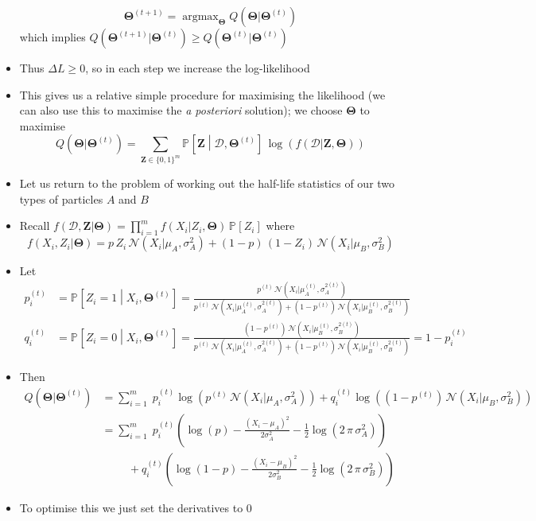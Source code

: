 \documentclass[11pt]{article}
\newcommand{\Prob}[2][]{\mathbb{P}_{#1\!}\left[ #2 \right]}
\newcommand{\logg}[1]{\log\!\left( #1 \right)}
\newcommand{\normal}[2]{\mathcal{N}\!\left(#1 \big| #2 \right)}
\newcommand{\argmax}{\mathop{\mathrm{argmax}}}
\begin{document}
\begin{itemize}
$$ \bm{\Theta}^{(t+1)} = \argmax_{\bm{\Theta}}
      Q(\bm{\Theta}|\bm{\Theta}^{(t)}) $$
which implies \(Q(\bm{\Theta}^{(t+1)}|\bm{\Theta}^{(t)}) \geq
      Q(\bm{\Theta}^{(t)}|\bm{\Theta}^{(t)})\)
\item Thus \(\Delta L\geq 0\), so in each step we increase the log-likelihood
\item This gives us a relative simple procedure for maximising the likelihood
(we can also use this to maximise the \emph{a posteriori} solution);
we choose \(\bm{\Theta}\) to maximise
$$ Q(\bm{\Theta}|\bm{\Theta}^{(t)}) = \sum_{\bm{Z}\in\{0,1\}^m} \Prob{\bm{Z}\middle|\mathcal{D},\bm{\Theta}^{(t)}}\,
      \logg{f(\mathcal{D}|\bm{Z}, \bm{\Theta})} $$
\item Let us return to the problem of working out the half-life statistics of
our two types of particles \(A\) and \(B\)
\item Recall \(f(\mathcal{D},\bm{Z} |\bm{\Theta}) =
      \prod\limits_{i=1}^m  f(X_i|Z_i,\bm{\Theta}) \, \Prob{Z_i}\) where
$$ f(X_i,Z_i|\bm{\Theta}) = p\, Z_i\,\normal{X_i}{\mu_A,\sigma_A^2} +
        (1-p)\,(1-Z_i)\,\normal{X_i}{\mu_B,\sigma_B^2} $$
\item Let 
 \begin{align*}
 p_i^{(t)} &= \Prob{Z_i=1\middle|X_i, \bm{\Theta}^{(t)}} = 
 \frac{p^{(t)}\, \normal{X_i}{\mu_A^{(t)},\sigma_A^{2(t)}} }
{ p^{(t)}\,\normal{X_i}{\mu_A^{(t)},\sigma_A^{2(t)}} + (1-p^{(t)})\, \normal{X_i}{\mu_B^{(t)},\sigma_B^{2(t)}} } \\
 q_i^{(t)} &= \Prob{Z_i=0\middle|X_i, \bm{\Theta}^{(t)}} =
 \frac{(1-p^{(t)})\,\normal{X_i}{\mu_B^{(t)},\sigma_B^{2(t)}}}
{p^{(t)}\, \normal{X_i}{\mu_A^{(t)},\sigma_A^{2(t)}} + (1-p^{(t)})\, \normal{X_i}{\mu_B^{(t)},\sigma_B^{2(t)}} }
 = 1-p_i^{(t)}
 \end{align*}
\item Then
\begin{align*}
Q(\bm{\Theta}|\bm{\Theta}^{(t)}) &= \sum_{i=1}^m \;
p_i^{(t)} \logg{p^{(t)}\,\normal{X_i}{\mu_A,\sigma_A^{2}}}
+ q_i^{(t)}  \logg{(1-p^{(t)})\,\normal{X_i}{\mu_B,\sigma_B^{2}}} \\ 
&= \sum_{i=1}^m \;
p_i^{(t)}\left(\log(p) -
\frac{(X_i-\mu_A)^2}{2\sigma_A^{2}}
  - \frac{1}{2} \logg{2\,\pi\,\sigma_A^{2}} \right) \\
  &\hspace{1cm}
  + q_i^{(t)}\left(\log(1-p) -
  \frac{(X_i-\mu_B)^2}{2\sigma_B^{2}}
  - \frac{1}{2} \logg{2\,\pi\,\sigma_B^{2}} \right) 
  \end{align*}
\item To optimise this we just set the derivatives to 0

\end{itemize}
\end{document}

